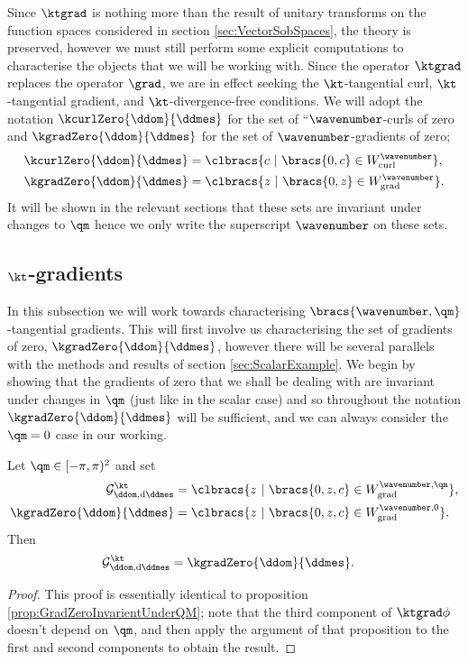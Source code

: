Since $\ktgrad$ is nothing more than the result of unitary transforms on the function spaces considered in section \ref{sec:VectorSobSpaces}, the theory is preserved, however we must still perform some explicit computations to characterise the objects that we will be working with.
Since the operator $\ktgrad$ replaces the operator $\grad$, we are in effect seeking the $\kt$-tangential curl, $\kt$-tangential gradient, and $\kt$-divergence-free conditions. 
We will adopt the notation $\kcurlZero{\ddom}{\ddmes}$ for the set of ``$\wavenumber$-curls of zero and $\kgradZero{\ddom}{\ddmes}$ for the set of $\wavenumber$-gradients of zero;
\begin{align*}
	\kcurlZero{\ddom}{\ddmes} &= \clbracs{ c \ \vert \ \bracs{0,c}\in W^{\wavenumber}_{\mathrm{curl}}}, \\
	\kgradZero{\ddom}{\ddmes} &= \clbracs{ z \ \vert \ \bracs{0,z}\in W^{\wavenumber}_{\mathrm{grad}}}.
\end{align*}
It will be shown in the relevant sections that these sets are invariant under changes to $\qm$ hence we only write the superscript $\wavenumber$ on these sets. \newline

\subsection{$\kt$-gradients} \label{sec:ktGradients}
In this subsection we will work towards characterising $\bracs{\wavenumber,\qm}$-tangential gradients.
This will first involve us characterising the set of gradients of zero, $\kgradZero{\ddom}{\ddmes}$, however there will be several parallels with the methods and results of section \ref{sec:ScalarExample}. 
We begin by showing that the gradients of zero that we shall be dealing with are invariant under changes in $\qm$ (just like in the scalar case) and so throughout the notation $\kgradZero{\ddom}{\ddmes}$ will be sufficient, and we can always consider the $\qm=0$ case in our working.
\begin{prop} \label{prop:kGradZeroInvarientUnderQM}
	Let $\qm\in[-\pi,\pi)^2$ and set 
	\begin{align*}
		\mathcal{G}^{\kt}_{\ddom, \mathrm{d}\ddmes} &= \clbracs{ z \ \vert \ \bracs{0,z,c}\in W^{\wavenumber, \qm}_{\mathrm{grad}}}, \\
		\kgradZero{\ddom}{\ddmes} &= \clbracs{ z \ \vert \ \bracs{0,z,c}\in W^{\wavenumber, 0}_{\mathrm{grad}}}.
	\end{align*}
	Then
	\begin{align*}
		\mathcal{G}^{\kt}_{\ddom, \mathrm{d}\ddmes} &= \kgradZero{\ddom}{\ddmes}.
	\end{align*}
\end{prop}
\begin{proof}
	This proof is essentially identical to proposition \ref{prop:GradZeroInvarientUnderQM}; note that the third component of $\ktgrad\phi$ doesn't depend on $\qm$, and then apply the argument of that proposition to the first and second components to obtain the result.
\end{proof}

